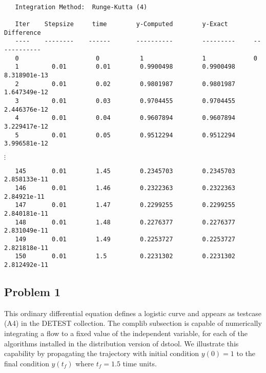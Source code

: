 \begin{verbatim}

   Integration Method:  Runge-Kutta (4) 
    
   Iter    Stepsize     time        y-Computed        y-Exact        Difference
   ----    --------    ------       ----------        ---------     ------------ 
   0                     0           1                1             0  
   1         0.01        0.01        0.9900498        0.9900498     8.318901e-13  
   2         0.01        0.02        0.9801987        0.9801987     1.647349e-12  
   3         0.01        0.03        0.9704455        0.9704455     2.446376e-12  
   4         0.01        0.04        0.9607894        0.9607894     3.229417e-12  
   5         0.01        0.05        0.9512294        0.9512294     3.996581e-12
\end{verbatim}
\vspace{-.1in}
\hspace{2.8in}$\vdots$
\vspace{-.1in}
\begin{verbatim}
   145       0.01        1.45        0.2345703        0.2345703     2.858133e-11  
   146       0.01        1.46        0.2322363        0.2322363     2.84921e-11  
   147       0.01        1.47        0.2299255        0.2299255     2.840181e-11  
   148       0.01        1.48        0.2276377        0.2276377     2.831049e-11  
   149       0.01        1.49        0.2253727        0.2253727     2.821818e-11  
   150       0.01        1.5         0.2231302        0.2231302     2.812492e-11
\end{verbatim}



\subsection{Problem 1}

\noindent  This ordinary differential equation defines a logistic curve and appears as testcase (A4)
in the DETEST collection.   The complib subsection is capable of numerically integrating a flow
to a fixed value of the independent variable, for each of the algorithms installed in the 
distribution version of dstool.  We illustrate this capability by propagating the trajectory with
initial condition $y(0) = 1$ to the final condition $y(t_f)$ where $t_f=1.5$ time units.

